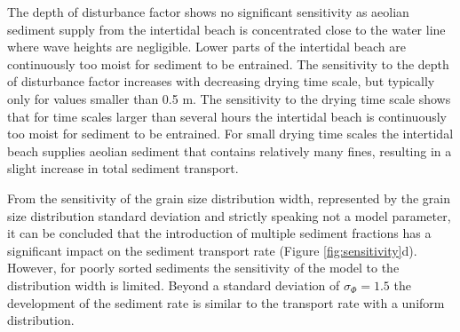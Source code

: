 The depth of disturbance factor shows no significant sensitivity as
aeolian sediment supply from the intertidal beach is concentrated
close to the water line where wave heights are negligible. Lower parts
of the intertidal beach are continuously too moist for sediment to be
entrained. The sensitivity to the depth of disturbance factor
increases with decreasing drying time scale, but typically only for
values smaller than 0.5 m.  The sensitivity to the drying time scale
shows that for time scales larger than several hours the intertidal
beach is continuously too moist for sediment to be entrained. For
small drying time scales the intertidal beach supplies aeolian
sediment that contains relatively many fines, resulting in a slight
increase in total sediment transport.

%

From the sensitivity of the grain size distribution width, represented
by the grain size distribution standard deviation and strictly
speaking not a model parameter, it can be concluded that the
introduction of multiple sediment fractions has a significant impact
on the sediment transport rate (Figure \ref{fig:sensitivity}d).
However, for poorly sorted sediments the sensitivity of the model to
the distribution width is limited. Beyond a standard deviation of
$\sigma_{\Phi} = 1.5$ the development of the sediment rate is similar
to the transport rate with a uniform distribution.

